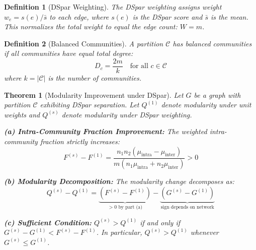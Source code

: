 \documentclass[10pt,journal,compsoc]{IEEEtran}
\newtheorem{theorem}{Theorem}
\newtheorem{definition}{Definition}
\begin{document}
\begin{definition}[DSpar Weighting]
The \emph{DSpar weighting} assigns weight $w_e = s(e)/\bar{s}$ to each edge, where $s(e)$ is the DSpar score and $\bar{s}$ is the mean. This normalizes the total weight to equal the edge count: $W = m$.
\end{definition}

\begin{definition}[Balanced Communities]
A partition $\mathcal{C}$ has \emph{balanced communities} if all communities have equal total degree:
\begin{equation}
D_c = \frac{2m}{k} \quad \text{for all } c \in \mathcal{C}
\end{equation}
where $k = |\mathcal{C}|$ is the number of communities.
\end{definition}


\begin{theorem}[Modularity Improvement under DSpar]
\label{thm:modularity}
Let $G$ be a graph with partition $\mathcal{C}$ exhibiting DSpar separation. Let $Q^{(1)}$ denote modularity under unit weights and $Q^{(s)}$ denote modularity under DSpar weighting.

\textbf{(a) Intra-Community Fraction Improvement:} The weighted intra-community fraction strictly increases:
\begin{equation}
F^{(s)} - F^{(1)} = \frac{n_1 n_2 (\mu_{\text{intra}} - \mu_{\text{inter}})}{m(n_1 \mu_{\text{intra}} + n_2 \mu_{\text{inter}})} > 0
\end{equation}

\textbf{(b) Modularity Decomposition:} The modularity change decomposes as:
\begin{equation}
Q^{(s)} - Q^{(1)} = \underbrace{(F^{(s)} - F^{(1)})}_{> 0 \text{ by part (a)}} - \underbrace{(G^{(s)} - G^{(1)})}_{\text{sign depends on network}}
\end{equation}

\textbf{(c) Sufficient Condition:} $Q^{(s)} > Q^{(1)}$ if and only if $G^{(s)} - G^{(1)} < F^{(s)} - F^{(1)}$.
In particular, $Q^{(s)} > Q^{(1)}$ whenever $G^{(s)} \leq G^{(1)}$.
\end{theorem}
\end{document}
